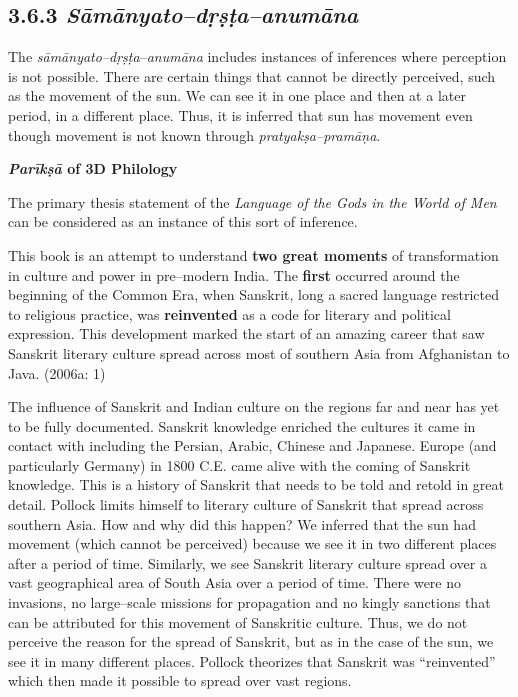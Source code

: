 \subsection*{3.6.3 {\it {\bfseries Sāmānyato–dṛṣṭa–anumāna}}}

The \textit{sāmānyato–dṛṣṭa}–\textit{anumāna} includes instances of inferences where perception is not possible. There are certain things that cannot be directly perceived, such as the movement of the sun. We can see it in one place and then at a later period, in a different place. Thus, it is inferred that sun has movement even though movement is not known through\textit{ pratyakṣa–pramāṇa}.

\textbf{\textit{Parīkṣā} of 3D Philology}

The primary thesis statement of the \textit{Language of the Gods in the World of Men} can be considered as an instance of this sort of inference.

\begin{myquote}
This book is an attempt to understand \textbf{two great moments} of transformation in culture and power in pre–modern India. The \textbf{first} occurred around the beginning of the Common Era, when Sanskrit, long a sacred language restricted to religious practice, was \textbf{reinvented} as a code for literary and political expression. This development marked the start of an amazing career that saw Sanskrit literary culture spread across most of southern Asia from Afghanistan to Java. (2006a: 1)
\end{myquote}

The influence of Sanskrit and Indian culture on the regions far and near has yet to be fully documented. Sanskrit knowledge enriched the cultures it came in contact with including the Persian, Arabic, Chinese and Japanese. Europe (and particularly Germany) in 1800 C.E. came alive with the coming of Sanskrit knowledge. This is a history of Sanskrit that needs to be told and retold in great detail. Pollock limits himself to literary culture of Sanskrit that spread across southern Asia. How and why did this happen? We inferred that the sun had movement (which cannot be perceived) because we see it in two different places after a period of time. Similarly, we see Sanskrit literary culture spread over a vast geographical area of South Asia over a period of time. There were no invasions, no large–scale missions for propagation and no kingly sanctions that can be attributed for this movement of Sanskritic culture. Thus, we do not perceive the reason for the spread of Sanskrit, but as in the case of the sun, we see it in many different places. Pollock theorizes that Sanskrit was “reinvented” which then made it possible to spread over vast regions.

